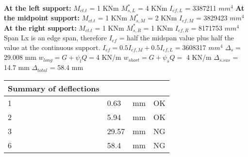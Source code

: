 \documentclass{article}%
\begin{document}
%
\newline%
\newline%
%
\textbf{At the left support:}%
\newline%
\newline%
%
$M_{ct.t}$ = 1 KNm%
\newline%
%
$M_{s,L}^{*}$ = 4 KNm%
\newline%
%
$I_{ef,L}$ = 3387211 $mm^{4}$%
\newline%
\newline%
%
\textbf{At the midpoint support:}%
\newline%
\newline%
%
$M_{ct.t}$ = 1 KNm%
\newline%
%
$M_{s,M}^{*}$ = 2 KNm%
\newline%
%
$I_{ef,M}$ = 3829423 $mm^{4}$%
\newline%
\newline%
%
\textbf{At the right support:}%
\newline%
\newline%
%
$M_{ct.t}$ = 1 KNm%
\newline%
%
$M_{s,R}^{*}$ = 1 KNm%
\newline%
%
$I_{ef,R}$ = 8171753 $mm^{4}$%
\newline%
\newline%
%
Span Lx is an edge span, therefore $I_{ef}$ = half the midspan value plus half the value at the continuous support.%
\newline%
\newline%
%
$I_{ef} = 0.5I_{ef,M} + 0.5I_{ef,L} = $3608317 $ mm^{4}$%
\newline%
\newline%
%
$\Delta_{s} =$29.008 mm%
\newline%
\newline%
%
$w_{long} = G + \psi_{l}Q = $4 KN/m%
\newline%
%
$w_{short} = G + \psi_{s}Q = $ 4 KN/m%
\newline%
\newline%
%
$\Delta_{s.sus}$ = 14.7 mm%
\newline%
\newline%
%
$\Delta_{total}$ = 58.4 mm%
\newline%
\newline%
%
\begin{tabular}{llll}%
Summary of deflections&&&\\%
\hline%
1&0.63& mm&OK\\%
2&5.94& mm&OK\\%
3&29.57& mm&NG\\%
6&58.4& mm&NG\\%
\end{tabular}%
\end{document}
